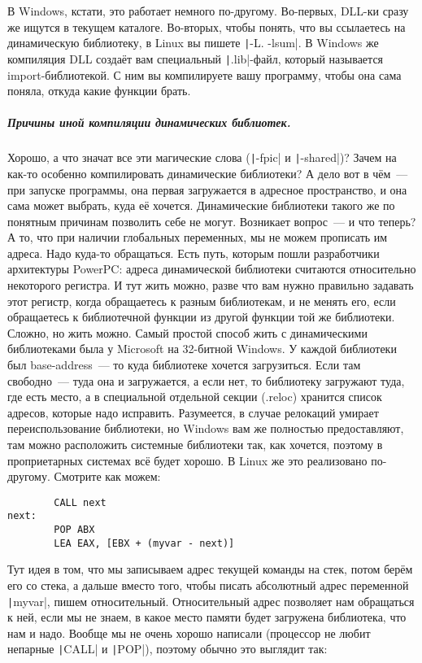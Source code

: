 \documentclass{article}
\begin{document}
    В Windows, кстати, это работает немного по-другому. Во-первых, DLL-ки сразу же ищутся в текущем каталоге. Во-вторых, чтобы понять, что вы ссылаетесь на динамическую библиотеку, в Linux вы пишете \texttt|-L. -lsum|. В Windows же компиляция DLL создаёт вам специальный \texttt|.lib|-файл, который называется import-библиотекой. С ним вы компилируете вашу программу, чтобы она сама поняла, откуда какие функции брать.
    \subparagraph{Причины иной компиляции динамических библиотек.}
    Хорошо, а что значат все эти магические слова (\texttt|-fpic| и \texttt|-shared|)? Зачем на как-то особенно компилировать динамические библиотеки? А дело вот в чём~--- при запуске программы, она первая загружается в адресное пространство, и она сама может выбрать, куда её хочется. Динамические библиотеки такого же по понятным причинам позволить себе не могут. Возникает вопрос~--- и что теперь? А то, что при наличии глобальных переменных, мы не можем прописать им адреса. Надо куда-то обращаться. Есть путь, которым пошли разработчики архитектуры PowerPC: адреса динамической библиотеки считаются относительно некоторого регистра. И тут жить можно, разве что вам нужно правильно задавать этот регистр, когда обращаетесь к разным библиотекам, и не менять его, если обращаетесь к библиотечной функции из другой функции той же библиотеки. Сложно, но жить можно. Самый простой способ жить с динамическими библиотеками была у Microsoft на 32-битной Windows. У каждой библиотеки был base-address~--- то куда библиотеке хочется загрузиться. Если там свободно~--- туда она и загружается, а если нет, то библиотеку загружают туда, где есть место, а в специальной отдельной секции (.reloc) хранится список адресов, которые надо исправить. Разумеется, в случае релокаций умирает переиспользование библиотеки, но Windows вам же полностью предоставляют, там можно расположить системные библиотеки так, как хочется, поэтому в проприетарных системах всё будет хорошо. В Linux же это реализовано по-другому. Смотрите как можем:
    \begin{verbatim}
        CALL next
next:
        POP ABX
        LEA EAX, [EBX + (myvar - next)]
    \end{verbatim}
    Тут идея в том, что мы записываем адрес текущей команды на стек, потом берём его со стека, а дальше вместо того, чтобы писать абсолютный адрес переменной \texttt|myvar|, пишем относительный. Относительный адрес позволяет нам обращаться к ней, если мы не знаем, в какое место памяти будет загружена библиотека, что нам и надо. Вообще мы не очень хорошо написали (процессор не любит непарные \texttt|CALL| и \texttt|POP|), поэтому обычно это выглядит так:
\end{document}
